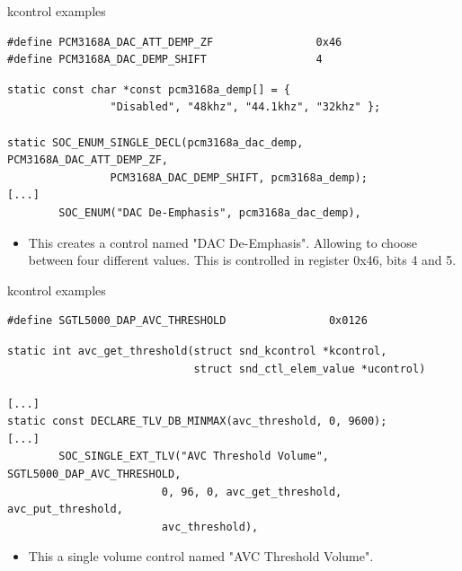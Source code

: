 \begin{frame}[fragile]{kcontrol examples}
  \begin{block}{}
    \fontsize{9}{9}\selectfont
    \begin{verbatim}
#define PCM3168A_DAC_ATT_DEMP_ZF                0x46
#define PCM3168A_DAC_DEMP_SHIFT                 4
    \end{verbatim}
  \end{block}
  \begin{block}{}
    \fontsize{9}{9}\selectfont
    \begin{verbatim}
static const char *const pcm3168a_demp[] = {
                "Disabled", "48khz", "44.1khz", "32khz" };

static SOC_ENUM_SINGLE_DECL(pcm3168a_dac_demp, PCM3168A_DAC_ATT_DEMP_ZF,
                PCM3168A_DAC_DEMP_SHIFT, pcm3168a_demp);
[...]
        SOC_ENUM("DAC De-Emphasis", pcm3168a_dac_demp),
    \end{verbatim}
  \end{block}
  \begin{itemize}
  \item This creates a control named "DAC De-Emphasis". Allowing to
    choose between four different values.
    This is controlled in register 0x46, bits 4 and 5.
  \end{itemize}
\end{frame}

\begin{frame}[fragile]{kcontrol examples}
  \begin{block}{}
    \fontsize{9}{9}\selectfont
    \begin{verbatim}
#define SGTL5000_DAP_AVC_THRESHOLD                0x0126
    \end{verbatim}
  \end{block}
  \begin{block}{}
    \fontsize{9}{9}\selectfont
    \begin{verbatim}
static int avc_get_threshold(struct snd_kcontrol *kcontrol,
                             struct snd_ctl_elem_value *ucontrol)

[...]
static const DECLARE_TLV_DB_MINMAX(avc_threshold, 0, 9600);
[...]
        SOC_SINGLE_EXT_TLV("AVC Threshold Volume", SGTL5000_DAP_AVC_THRESHOLD,
                        0, 96, 0, avc_get_threshold, avc_put_threshold,
                        avc_threshold),
    \end{verbatim}
  \end{block}
  \begin{itemize}
  \item This a single volume control named "AVC Threshold Volume".
  \end{itemize}
\end{frame}

